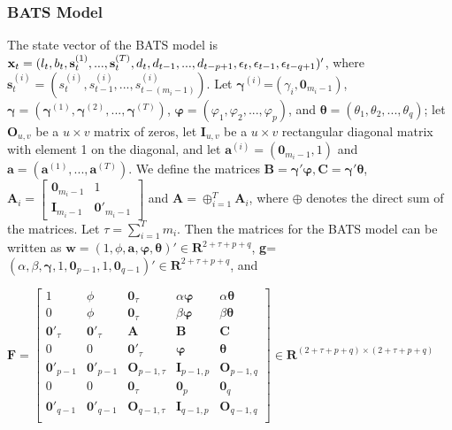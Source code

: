 \documentclass{uwstat572}
\begin{document}
\subsubsection{BATS Model}
\hspace{4ex}The state vector of the BATS model is $\textbf{x}_t=(l_t,b_t,\textbf{s}_t^{(1)},...,\textbf{s}_t^{(T)}, d_t, d_{t-1},..., d_{t-p+1}, \epsilon_t, \epsilon_{t-1},\\ \epsilon_{t-q+1} )'$, 
where $\textbf{s}_t^{(i)}=(s_t^{(i)}, s_{t-1}^{(i)} ,..., s_{t-(m_i-1)}^{(i)}  )$. Let $\bm{\gamma}^{(i)}$=$(\gamma_i, \textbf{0}_{m_i-1})$, $\bm{\gamma}=(\bm{\gamma}^{(1)},\bm{\gamma}^{(2)},...,\bm{\gamma}^{(T)})$, $\bm{\varphi}=(\varphi_1, \varphi_2,..., \varphi_p)$, and $\bm{\theta}=(\theta_1,\theta_2,...,\theta_q)$; let $\textbf{O}_{u,v}$ be a $u \times v$ matrix of zeros, let $\textbf{I}_{u,v}$ be a $u \times v$ rectangular diagonal matrix with element 1 on the diagonal, and let $\textbf{a}^{(i)}=(\textbf{0}_{m_i-1},1)$ and $\textbf{a}=(\textbf{a}^{(1)},...,\textbf{a}^{(T)})$. We define the matrices $\textbf{B}=\bm{\gamma}'\bm{\varphi}, \textbf{C}=\bm{\gamma}'\bm{\theta}$, $\textbf{A}_i=\begin{bmatrix} 
\textbf{0}_{m_i-1} &1 \\ 
\textbf{I}_{m_i-1} & \textbf{0}'_{m_i-1} 
\end{bmatrix}$ and $\textbf{A}=\oplus _{i=1}^T \textbf{A}_i$, where $\oplus$ denotes the direct sum of the matrices. Let $\tau=\sum_{i=1}^{T} m_i$. 
Then the matrices for the BATS model can be written as $\textbf{w}=(1,\phi,\textbf{a}, \bm{\varphi}, \bm{\theta})' \in \mathbf{R}^{2+\tau+p+q}$, \textbf{g}=$(\alpha,\beta,\bm{\gamma}, 1, \textbf{0}_{p-1}, 1, \textbf{0}_{q-1})'\in \mathbf{R}^{2+\tau+p+q}$, and 

\begin{center}
$\textbf{F}=\begin{bmatrix} 
1 & \phi& \textbf{0}_\tau & \alpha \bm{\varphi} & \alpha \bm{\theta}  \\
0 & \phi& \textbf{0}_\tau & \beta \bm{\varphi} & \beta \bm{\theta}  \\
\textbf{0}'_\tau &  \textbf{0}'_\tau  & \bm{A} & \bm{B} & \bm{C} \\
0 & 0 & \textbf{0}'_\tau & \bm{\varphi} & \bm{\theta}  \\
\bm{0}'_{p-1} & \bm{0}'_{p-1} & \textbf{O}_{p-1,\tau} & \bm{I}_{p-1,p} &\textbf{O}_{p-1,q} \\
0 & 0 &\textbf{0}_\tau & \textbf{0}_p & \textbf{0}_q \\
\bm{0}'_{q-1} & \bm{0}'_{q-1} & \textbf{O}_{q-1,\tau} & \bm{I}_{q-1,p} &\textbf{O}_{q-1,q} \\
\end{bmatrix} \in \mathbf{R}^{(2+\tau+p+q) \times (2+\tau+p+q)}$ 
\end{center}
\end{document}
